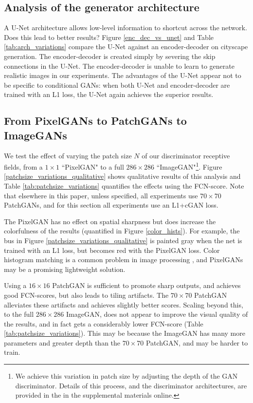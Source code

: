 \subsection{Analysis of the generator architecture}\label{analysis_of_gen_arch}

A U-Net architecture allows low-level information to shortcut across the network. Does this lead to better results? Figure \ref{enc_dec_vs_unet} and Table \ref{tab:arch_variations} compare the U-Net against an encoder-decoder on cityscape generation. The encoder-decoder is created simply by severing the skip connections in the U-Net. The encoder-decoder is unable to learn to generate realistic images in our experiments. The advantages of the U-Net appear not to be specific to conditional GANs: when both U-Net and encoder-decoder are trained with an L1 loss, the U-Net again achieves the superior results.

\subsection{From PixelGANs to PatchGANs to ImageGANs}\label{patch_variations_section}

We test the effect of varying the patch size $N$ of our discriminator receptive fields, from a $1\times1$ ``PixelGAN" to a full $286\times286$ ``ImageGAN"\footnote{We achieve this variation in patch size by adjusting the depth of the GAN discriminator. Details of this process, and the discriminator architectures, are provided in the in the supplemental materials online.}. Figure \ref{patchsize_variations_qualitative} shows qualitative results of this analysis and Table \ref{tab:patchsize_variations} quantifies the effects using the FCN-score. Note that elsewhere in this paper, unless specified, all experiments use $70\times70$ PatchGANs, and for this section all experiments use an L1+cGAN loss.

The PixelGAN has no effect on spatial sharpness but does increase the colorfulness of the results (quantified in Figure \ref{color_hists}). For example, the bus in Figure \ref{patchsize_variations_qualitative} is painted gray when the net is trained with an L1 loss, but becomes red with the PixelGAN loss. Color histogram matching is a common problem in image processing \cite{reinhard_color_2001}, and PixelGANs may be a promising lightweight solution.

Using a $16\times16$ PatchGAN is sufficient to promote sharp outputs, and achieves good FCN-scores, but also leads to tiling artifacts. The $70\times70$ PatchGAN alleviates these artifacts and achieves slightly better scores. Scaling beyond this, to the full $286\times286$ ImageGAN, does not appear to improve the visual quality of the results, and in fact gets a considerably lower FCN-score (Table \ref{tab:patchsize_variations}). This may be because the ImageGAN has many more parameters and greater depth than the $70\times70$ PatchGAN, and may be harder to train.

